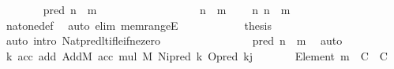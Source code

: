 \begin{isabellebody}
\ \ \ \ \ \ \isamarkupfalse%
\ {\isachardoublequoteopen}pred\ n\ {\isacharless}{\kern0pt}\ m{\isachardoublequoteclose}\isanewline
\ \ \ \ \ \ \isamarkupfalse%
\ {\isacharminus}{\kern0pt}\isanewline
\ \ \ \ \ \ \ \ \isamarkupfalse%
\ {\isacartoucheopen}n\ {\isasymin}\ {\isacharbrackleft}{\kern0pt}{}{\isacharcomma}{\kern0pt}{\isasymdots}{\isacharcomma}{\kern0pt}m{\isacharbrackright}{\kern0pt}{\isacartoucheclose}\ \isamarkupfalse%
\ {\isachardoublequoteopen}{}\ {\isasymnoteq}\ n{\isachardoublequoteclose}\ {\isachardoublequoteopen}n\ {\isasymle}\ m{\isachardoublequoteclose}\isanewline
\ \ \ \ \ \ \ \ \ \ \isamarkupfalse%
\ nat{\isacharunderscore}{\kern0pt}one{\isacharunderscore}{\kern0pt}def\ \isamarkupfalse%
\ {\isacharparenleft}{\kern0pt}auto\ elim{\isacharcolon}{\kern0pt}\ mem{\isacharunderscore}{\kern0pt}rangeE{\isacharparenright}{\kern0pt}\isanewline
\ \ \ \ \ \ \ \ \isamarkupfalse%
\ \isamarkupfalse%
\ {\isacharquery}{\kern0pt}thesis\ \isamarkupfalse%
\ {\isacharparenleft}{\kern0pt}auto\ intro{\isacharcolon}{\kern0pt}\ Nat{\isacharunderscore}{\kern0pt}pred{\isacharunderscore}{\kern0pt}lt{\isacharunderscore}{\kern0pt}if{\isacharunderscore}{\kern0pt}le{\isacharunderscore}{\kern0pt}if{\isacharunderscore}{\kern0pt}ne{\isacharunderscore}{\kern0pt}zero{\isacharparenright}{\kern0pt}\isanewline
\ \ \ \ \ \ \isamarkupfalse%
\isanewline
\ \ \ \ \ \ \isamarkupfalse%
\ \isamarkupfalse%
\ {\isachardoublequoteopen}pred\ n\ {\isasymin}\ {\isacharbrackleft}{\kern0pt}{}{\isacharcomma}{\kern0pt}{\isasymdots}{\isacharcomma}{\kern0pt}m{\isacharbrackleft}{\kern0pt}{\isachardoublequoteclose}\ \isamarkupfalse%
\ auto\isanewline
\ \ \ \ \isamarkupfalse%
\isanewline
\ \ \ \ \isamarkupfalse%
\ {\isachardoublequoteopen}{\isacharparenleft}{\kern0pt}{\isasymlambda}k\ acc{\isachardot}{\kern0pt}\ add\ AddM\ acc\ {\isacharparenleft}{\kern0pt}mul\ M\ {\isacharparenleft}{\kern0pt}N{\isacharbackquote}{\kern0pt}i{\isacharbackquote}{\kern0pt}{\isacharparenleft}{\kern0pt}pred\ k{\isacharparenright}{\kern0pt}{\isacharparenright}{\kern0pt}\ {\isacharparenleft}{\kern0pt}O{\isacharbackquote}{\kern0pt}{\isacharparenleft}{\kern0pt}pred\ k{\isacharparenright}{\kern0pt}{\isacharbackquote}{\kern0pt}j{\isacharparenright}{\kern0pt}{\isacharparenright}{\kern0pt}{\isacharparenright}{\kern0pt}\isanewline
\ \ \ \ \ \ {\isacharcolon}{\kern0pt}\ Element\ {\isacharbrackleft}{\kern0pt}{}{\isacharcomma}{\kern0pt}{\isasymdots}{\isacharcomma}{\kern0pt}m{\isacharbrackright}{\kern0pt}\ {\isasymRightarrow}\ C\ {\isasymRightarrow}\ C{\isachardoublequoteclose}\isanewline

\end{isabellebody}
